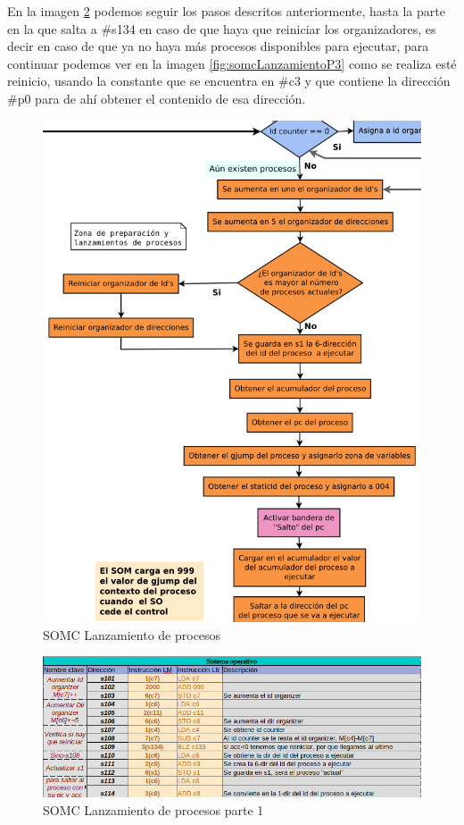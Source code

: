 \documentclass[letterpaper,12pt,oneside]{book}
\begin{document}
		
		En la imagen \ref{fig:somcLanzamientoP1} podemos seguir los pasos descritos anteriormente, hasta la parte en la que salta a \#s134 en caso de que haya
		que reiniciar los organizadores, es decir en caso de que ya no haya más procesos disponibles para ejecutar, para continuar podemos ver en la imagen
		\ref{fig:somcLanzamientoP3} como se realiza esté reinicio, usando la constante que se encuentra en \#c3 y que contiene la dirección \#p0 para
		de ahí obtener el contenido de esa dirección.
		
		

		
		\begin{figure}[h]		
			\centering
			\includegraphics[scale=0.48]{media/CARDIACC/diagLanzamientoProcesos.png}
			\caption{ SOMC Lanzamiento de procesos}
			\label{fig:diagLanzProce}
		\end{figure}
		
		
		\begin{figure}[h]		
			\centering
			\includegraphics[scale=0.55]{media/CARDIACC/SO_EjecutarProceso.png}
			\caption{ SOMC Lanzamiento de procesos parte 1}
			\label{fig:somcLanzamientoP1}
		\end{figure}
		
\end{document}
